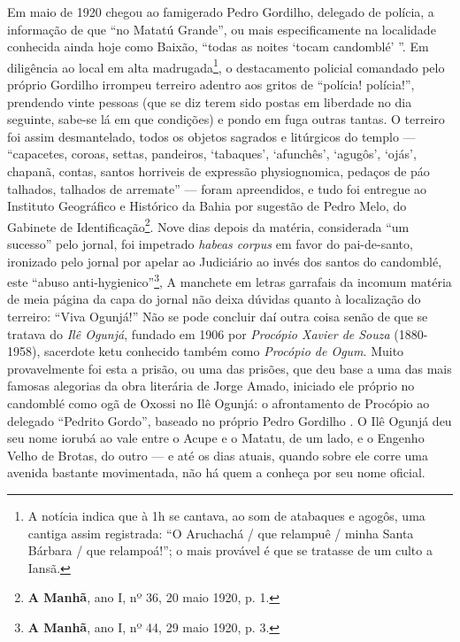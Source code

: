 Em maio de 1920 chegou ao famigerado Pedro Gordilho, delegado de polícia, a informação de que ``no Matatú Grande'', ou mais especificamente na localidade conhecida ainda hoje como Baixão, ``todas as noites `tocam candomblé' ''. Em diligência ao local em alta madrugada\footnote{A notícia indica que à 1h se cantava, ao som de atabaques e agogôs, uma cantiga assim registrada: ``O Aruchachá / que relampuê / minha Santa Bárbara / que relampoá!''; o mais provável é que se tratasse de um culto a Iansã.}, o destacamento policial comandado pelo próprio Gordilho irrompeu terreiro adentro aos gritos de ``polícia! polícia!'', prendendo vinte pessoas (que se diz terem sido postas em liberdade no dia seguinte, sabe-se lá em que condições) e pondo em fuga outras tantas. O terreiro foi assim desmantelado, todos os objetos sagrados e litúrgicos do templo --- ``capacetes, coroas, settas, pandeiros, `tabaques', `afunchês', `agugôs', `ojás', chapanã, contas, santos horriveis de expressão physiognomica, pedaços de páo talhados, talhados de arremate'' --- foram apreendidos, e tudo foi entregue ao Instituto Geográfico e Histórico da Bahia por sugestão de Pedro Melo, do Gabinete de Identificação\footnote{\textbf{A Manhã}, ano I, nº 36, 20 maio 1920, p. 1.}. Nove dias depois da matéria, considerada ``um sucesso'' pelo jornal, foi impetrado \textit{habeas corpus} em favor do pai-de-santo, ironizado pelo jornal por apelar ao Judiciário ao invés dos santos do candomblé, este ``abuso anti-hygienico''\footnote{\textbf{A Manhã}, ano I, nº 44, 29 maio 1920, p. 3.}, A manchete em letras garrafais da incomum matéria de meia página da capa do jornal não deixa dúvidas quanto à localização do terreiro: ``Viva Ogunjá!'' Não se pode concluir daí outra coisa senão de que se tratava do \textit{Ilê Ogunjá}, fundado em 1906 por \textit{Procópio Xavier de Souza} (1880-1958), sacerdote ketu conhecido também como \textit{Procópio de Ogum}. Muito provavelmente foi esta a prisão, ou uma das prisões, que deu base a uma das mais famosas alegorias da obra literária de Jorge Amado, iniciado ele próprio no candomblé como ogã de Oxossi no Ilê Ogunjá: o afrontamento de Procópio ao delegado ``Pedrito Gordo'', baseado no próprio Pedro Gordilho \cite[p.~236-242]{amado_tenda_2010}. O Ilê Ogunjá deu seu nome iorubá ao vale entre o Acupe e o Matatu, de um lado, e o Engenho Velho de Brotas, do outro --- e até os dias atuais, quando sobre ele corre uma avenida bastante movimentada, não há quem a conheça por seu nome oficial.

